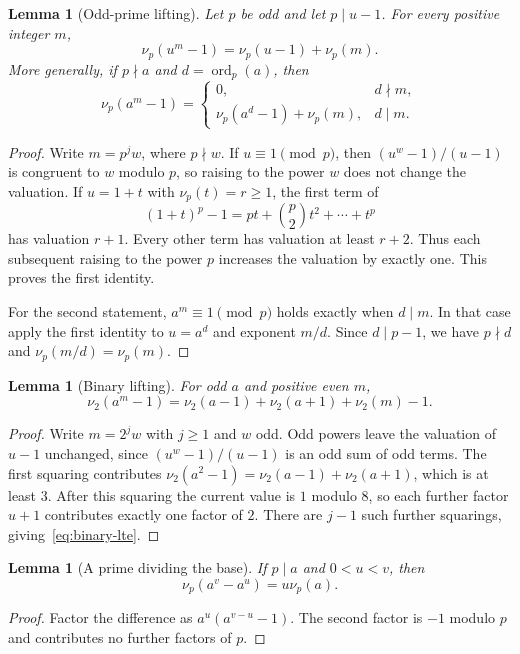 \documentclass[11pt,a4paper]{article}
\newtheorem{lemma}[theorem]{Lemma}
\theoremstyle{definition}
\newcommand{\ord}{\operatorname{ord}}
\begin{document}
\begin{lemma}[Odd-prime lifting]\label{lem:odd-lte}
Let $p$ be odd and let $p\mid u-1$. For every positive integer $m$,
\[
\nu_p(u^m-1)=\nu_p(u-1)+\nu_p(m).
\]
More generally, if $p\nmid a$ and $d=\ord_p(a)$, then
\[
\nu_p(a^m-1)=
\begin{cases}
0,&d\nmid m,\\
\nu_p(a^d-1)+\nu_p(m),&d\mid m.
\end{cases}
\]
\end{lemma}
\begin{proof}
Write $m=p^j w$, where $p\nmid w$. If $u\equiv1\pmod p$, then
$(u^w-1)/(u-1)$ is congruent to $w$ modulo $p$, so raising to the power $w$
does not change the valuation. If $u=1+t$ with $\nu_p(t)=r\ge1$, the first
term of
\[
(1+t)^p-1=pt+\binom p2t^2+\cdots+t^p
\]
has valuation $r+1$. Every other term has valuation at least $r+2$.
Thus each subsequent raising to the power $p$ increases the valuation by
exactly one. This proves the first identity.

For the second statement, $a^m\equiv1\pmod p$ holds exactly when $d\mid m$.
In that case apply the first identity to $u=a^d$ and exponent $m/d$.
Since $d\mid p-1$, we have $p\nmid d$ and $\nu_p(m/d)=\nu_p(m)$.
\end{proof}

\begin{lemma}[Binary lifting]\label{lem:two-lte}
For odd $a$ and positive even $m$,
\begin{equation}\label{eq:binary-lte}
\nu_2(a^m-1)=\nu_2(a-1)+\nu_2(a+1)+\nu_2(m)-1.
\end{equation}
\end{lemma}
\begin{proof}
Write $m=2^j w$ with $j\ge1$ and $w$ odd. Odd powers leave the valuation of
$u-1$ unchanged, since $(u^w-1)/(u-1)$ is an odd sum of odd terms.
The first squaring contributes
$\nu_2(a^2-1)=\nu_2(a-1)+\nu_2(a+1)$, which is at least $3$.
After this squaring the current value is $1$ modulo $8$, so each further
factor $u+1$ contributes exactly one factor of $2$. There are $j-1$ such
further squarings, giving~\eqref{eq:binary-lte}.
\end{proof}

\begin{lemma}[A prime dividing the base]\label{lem:nonunit}
If $p\mid a$ and $0<u<v$, then
\[
\nu_p(a^v-a^u)=u\nu_p(a).
\]
\end{lemma}
\begin{proof}
Factor the difference as $a^u(a^{v-u}-1)$. The second factor is $-1$ modulo
$p$ and contributes no further factors of $p$.
\end{proof}
\end{document}

